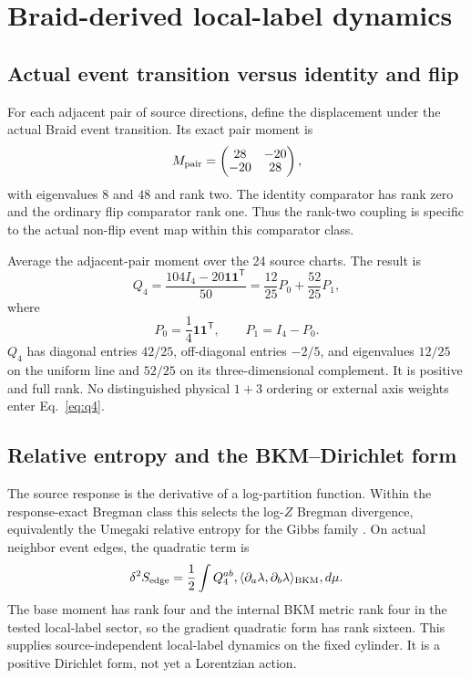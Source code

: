 \documentclass[11pt]{article}
\theoremstyle{definition}
\theoremstyle{remark}
\begin{document}
\section{Braid-derived local-label dynamics}

\subsection{Actual event transition versus identity and flip}

For each adjacent pair of source directions, define the displacement under the actual Braid event transition. Its exact pair moment is
\begin{equation}
 M_{\rm pair}=
 \begin{pmatrix}
 28&-20\\[-0.15em]
 -20&28
 \end{pmatrix},
\end{equation}
with eigenvalues $8$ and $48$ and rank two. The identity comparator has rank zero and the ordinary flip comparator rank one. Thus the rank-two coupling is specific to the actual non-flip event map within this comparator class.

Average the adjacent-pair moment over the 24 source charts. The result is
\begin{equation}\label{eq:q4}
 Q_4=\frac{104I_4-20\mathbf1\mathbf1^{\mathsf T}}{50}
 =\frac{12}{25}P_0+\frac{52}{25}P_1,
\end{equation}
where
\begin{equation}
 P_0=\frac14\mathbf1\mathbf1^{\mathsf T},\qquad
 P_1=I_4-P_0.
\end{equation}
$Q_4$ has diagonal entries $42/25$, off-diagonal entries $-2/5$, and eigenvalues $12/25$ on the uniform line and $52/25$ on its three-dimensional complement. It is positive and full rank. No distinguished physical $1+3$ ordering or external axis weights enter Eq.~\eqref{eq:q4}.

\subsection{Relative entropy and the BKM--Dirichlet form}

The source response is the derivative of a log-partition function. Within the response-exact Bregman class this selects the log-$Z$ Bregman divergence, equivalently the Umegaki relative entropy for the Gibbs family \cite{umegaki1962,amari2016}. On actual neighbor event edges, the quadratic term is
\begin{equation}\label{eq:bkm}
 \delta^2 S_{\rm edge}
 =\frac12\int Q_4^{ab},
 \langle \partial_a\lambda,\partial_b\lambda\rangle_{\rm BKM},d\mu.
\end{equation}
The base moment has rank four and the internal BKM metric rank four in the tested local-label sector, so the gradient quadratic form has rank sixteen. This supplies source-independent local-label dynamics on the fixed cylinder. It is a positive Dirichlet form, not yet a Lorentzian action.
\end{document}
